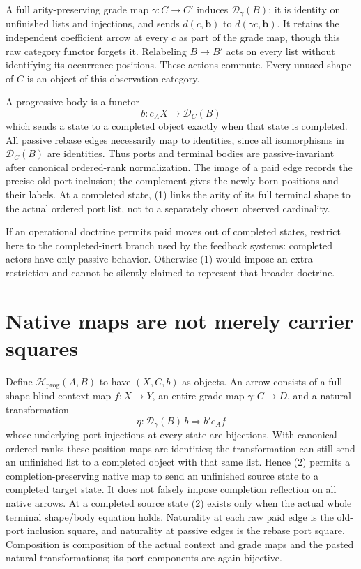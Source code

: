 \documentclass[11pt]{article}\usepackage{amsmath,amssymb,amsthm,geometry}\geometry{margin=1in}
\begin{document}
A full arity-preserving grade map $\gamma:C\to C'$ induces $\mathcal D_\gamma(B)$: it is identity on unfinished lists and injections, and sends $d(c,\mathbf b)$ to $d(\gamma c,\mathbf b)$. It retains the independent coefficient arrow at every $c$ as part of the grade map, though this raw category functor forgets it. Relabeling $B\to B'$ acts on every list without identifying its occurrence positions. These actions commute. Every unused shape of $C$ is an object of this observation category.

A progressive body is a functor
\[
 b:e_AX\longrightarrow\mathcal D_C(B)                         \tag{1}
\]
which sends a state to a completed object exactly when that state is completed. All passive rebase edges necessarily map to identities, since all isomorphisms in $\mathcal D_C(B)$ are identities. Thus ports and terminal bodies are passive-invariant after canonical ordered-rank normalization. The image of a paid edge records the precise old-port inclusion; the complement gives the newly born positions and their labels. At a completed state, (1) links the arity of its full terminal shape to the actual ordered port list, not to a separately chosen observed cardinality.

If an operational doctrine permits paid moves out of completed states, restrict here to the completed-inert branch used by the feedback systems: completed actors have only passive behavior. Otherwise (1) would impose an extra restriction and cannot be silently claimed to represent that broader doctrine.

\section{Native maps are not merely carrier squares}
Define $\mathcal H_{\mathrm{prog}}(A,B)$ to have $(X,C,b)$ as objects. An arrow consists of a full shape-blind context map $f:X\to Y$, an entire grade map $\gamma:C\to D$, and a natural transformation
\[
 \eta:\mathcal D_\gamma(B)\,b\Longrightarrow b' e_Af          \tag{2}
\]
whose underlying port injections at every state are bijections. With canonical ordered ranks these position maps are identities; the transformation can still send an unfinished list to a completed object with that same list. Hence (2) permits a completion-preserving native map to send an unfinished source state to a completed target state. It does not falsely impose completion reflection on all native arrows. At a completed source state (2) exists only when the actual whole terminal shape/body equation holds. Naturality at each raw paid edge is the old-port inclusion square, and naturality at passive edges is the rebase port square. Composition is composition of the actual context and grade maps and the pasted natural transformations; its port components are again bijective.
\end{document}
